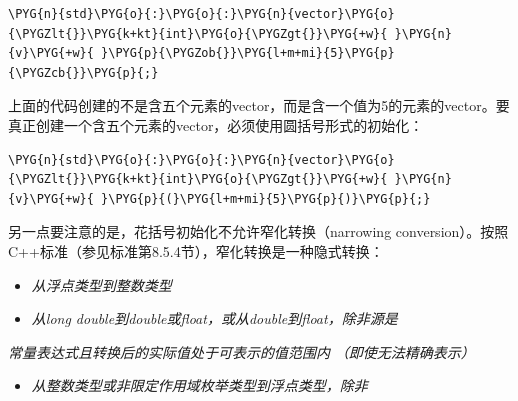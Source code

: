 
\begin{codeblockbg}
\begin{Verbatim}[commandchars=\\\{\},breaklines=true,breakanywhere=true,fontsize=\codefont,xleftmargin=17bp]
\PYG{n}{std}\PYG{o}{:}\PYG{o}{:}\PYG{n}{vector}\PYG{o}{\PYGZlt{}}\PYG{k+kt}{int}\PYG{o}{\PYGZgt{}}\PYG{+w}{ }\PYG{n}{v}\PYG{+w}{ }\PYG{p}{\PYGZob{}}\PYG{l+m+mi}{5}\PYG{p}{\PYGZcb{}}\PYG{p}{;}
\end{Verbatim}
\end{codeblockbg}



上面的代码创建的不是含五个元素的vector，而是含一个值为5的元素的vector。要真正创建一个含五个元素的vector，必须使用圆括号形式的初始化：



\begin{codeblockbg}
\begin{Verbatim}[commandchars=\\\{\},breaklines=true,breakanywhere=true,fontsize=\codefont,xleftmargin=17bp]
\PYG{n}{std}\PYG{o}{:}\PYG{o}{:}\PYG{n}{vector}\PYG{o}{\PYGZlt{}}\PYG{k+kt}{int}\PYG{o}{\PYGZgt{}}\PYG{+w}{ }\PYG{n}{v}\PYG{+w}{ }\PYG{p}{(}\PYG{l+m+mi}{5}\PYG{p}{)}\PYG{p}{;}
\end{Verbatim}
\end{codeblockbg}



另一点要注意的是，花括号初始化不允许窄化转换（narrowing conversion）。按照C++标准（参见标准第8.5.4节），窄化转换是一种隐式转换：



\begin{itemize}
\item \textit{从浮点类型到整数类型}



\item \textit{从long double到double或float，或从double到float，除非源是}


\end{itemize}



\textit{常量表达式且转换后的实际值处于可表示的值范围内} \textit{（即使无法精确表示）}



\begin{itemize}
\item \textit{从整数类型或非限定作用域枚举类型到浮点类型，除非}


\end{itemize}


